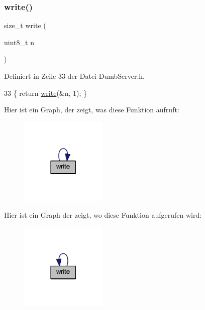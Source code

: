 \subsubsection{\texorpdfstring{write()}{write()}\hspace{0.1cm}{\footnotesize\ttfamily [2/6]}}
{\footnotesize\ttfamily size\+\_\+t write (\begin{DoxyParamCaption}\item[{uint8\+\_\+t}]{n }\end{DoxyParamCaption})\hspace{0.3cm}{\ttfamily [inline]}}



Definiert in Zeile 33 der Datei Dumb\+Server.\+h.


\begin{DoxyCode}
33 \{ \textcolor{keywordflow}{return} \hyperlink{class_esp_server_a7c66fc8d559f4956d4ccea196299bca7}{write}(&n, 1); \}
\end{DoxyCode}
Hier ist ein Graph, der zeigt, was diese Funktion aufruft\+:\nopagebreak
\begin{figure}[H]
\begin{center}
\leavevmode
\includegraphics[width=117pt]{class_esp_server_af32c245c813bbadb566538bba418b0fe_cgraph}
\end{center}
\end{figure}
Hier ist ein Graph der zeigt, wo diese Funktion aufgerufen wird\+:\nopagebreak
\begin{figure}[H]
\begin{center}
\leavevmode
\includegraphics[width=117pt]{class_esp_server_af32c245c813bbadb566538bba418b0fe_icgraph}
\end{center}
\end{figure}
\mbox{\label{class_esp_server_a0ba52a995edf9b6c2cdf3d396be84ff1}} 
